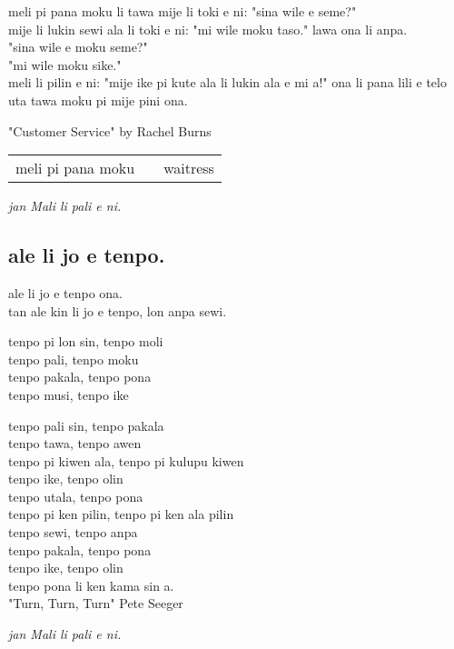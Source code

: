 meli pi pana moku li tawa mije li toki e ni: "sina wile e seme?" \\
mije li lukin sewi ala li toki e ni: "mi wile moku taso." lawa ona li anpa. \\
"sina wile e moku seme?" \\
"mi wile moku sike." \\
meli li pilin e ni: "mije ike pi kute ala li lukin ala e mi a!"
ona li pana lili e telo uta tawa moku pi mije pini ona.

"Customer Service" by Rachel Burns

\begin{supertabular}{p{5,5cm}|ll}
meli pi pana moku && waitress \\
\end{supertabular}

\textit{jan Mali li pali e ni. \cite{www:astrodonunt:01}}

\subsection{ale li jo e tenpo.}

ale li jo e tenpo ona. \\
tan ale kin li jo e tenpo, lon anpa sewi.

tenpo pi lon sin, tenpo moli \\
tenpo pali, tenpo moku \\
tenpo pakala, tenpo pona \\
tenpo musi, tenpo ike

tenpo pali sin, tenpo pakala \\
tenpo tawa, tenpo awen \\
tenpo pi kiwen ala, tenpo pi kulupu kiwen \\

tenpo ike, tenpo olin \\
tenpo utala, tenpo pona \\
tenpo pi ken pilin, tenpo pi ken ala pilin \\

tenpo sewi, tenpo anpa \\
tenpo pakala, tenpo pona \\
tenpo ike, tenpo olin \\
tenpo pona li ken kama sin a. \\

"Turn, Turn, Turn" Pete Seeger 

\textit{jan Mali li pali e ni. \cite{www:astrodonunt:01}}

